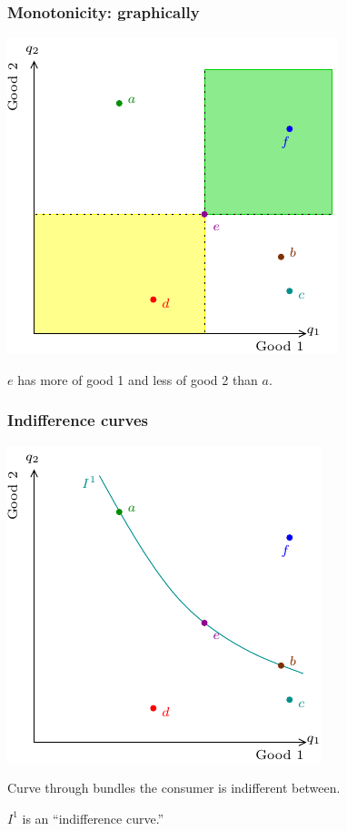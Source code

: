 \documentclass[xcolor=pdftex,dvipsnames]{beamer}
\begin{document}
\begin{frame}
\frametitle{Monotonicity: graphically}
\begin{center}
\includegraphics{pics/Monoton}
\end{center}
$e$ has more of good 1 and less of good 2 than $a$.
\bigskip

\end{frame}


\begin{frame}\frametitle{Indifference curves}
\begin{center}
\includegraphics{pics/Indif}
\end{center}
Curve through bundles the consumer is indifferent between.
\bigskip

$I^1$ is an ``indifference curve.''
\end{frame}
\end{document}
